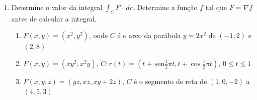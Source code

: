 \documentclass[a4paper,5pt]{amsbook}
\newcommand{\sen}{\,\mbox{sen}}
\begin{document}
\begin{enumerate}
    \item Determine o valor da integral $\int_C F\cdot\ dr$. Determine a fun\c{c}\~ao
    $f$ tal que $F=\nabla f$ antes de calcular a integral.
        \begin{enumerate}
            \setlength\itemsep{0.3cm}
            \item $F(x,y) = (x^2,y^2)$, onde $C$ \'e o arco da par\'abola $y=2x^2$
            de $(-1,2)$ e $(2,8)$
            \item $F(x,y) = (xy^2, x^2y)$, $C: r(t)=\left(t+\sen{\frac{1}{2}\pi
            t}, t+\cos{\frac{1}{2}\pi t}\right)$, $0\le t\le 1$
            \item $F(x,y,z) = (yz, xz, xy+2z)$, $C$ \'e o segmento de reta de
            $(1,0,-2)$ a $(4,5,3)$
        \end{enumerate}
\end{enumerate}
\end{document}
